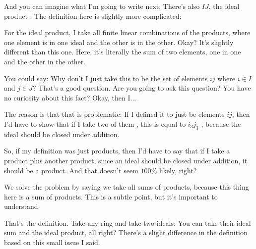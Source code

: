 \begin{speech}[01:12:09 - 01:14:12]
And you can imagine what I'm going to write next: There's also $IJ$, the ideal product . The definition here is slightly more complicated: 

For the ideal product, I take all finite linear combinations of the products, where one element is in one ideal and the other is in the other. Okay? It's slightly different than this one. Here, it's literally the sum of two elements, one in one and the other in the other.

You could say: Why don't I just take this to be the set of elements $ij$ where $i \in I$ and $j \in J$? That's a good question. Are you going to ask this question? You have no curiosity about this fact? Okay, then I... 

The reason is that that is problematic: If I defined it to just be elements $ij$, then I'd have to show that if I take two of them , this is equal to $i_3 j_3$ , because the ideal should be closed under addition.

So, if my definition was just products, then I'd have to say that if I take a product plus another product, since an ideal should be closed under addition, it should be a product. And that doesn't seem $100\%$ likely, right?

We solve the problem by saying we take all sums of products, because this thing here is a sum of products. This is a subtle point, but it's important to understand.

That's the definition. Take any ring and take two ideals: You can take their ideal sum and the ideal product, all right? There's a slight difference in the definition based on this small issue I said.
\end{speech}

